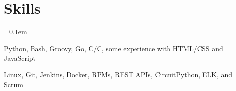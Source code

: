 \documentclass[11pt,letterpaper]{article}
\newcommand{\ResumeSection}[1]{
    \section*{ {\color{MidnightBlue}#1 \sout{\hfill} } }
}
\newcommand{\CPP}{C\nolinebreak[4]\hspace{-.05em}\raisebox{.22ex}{\footnotesize\bf ++}\xspace}
\newcommand{\hbmp}{\hspace{0.02in}}
\newcommand{\iconsize}{8px}
\newcommand{\boxwidth}{4cm}
\begin{document}


\ResumeSection{Skills}

\begin{description}[leftmargin=!, labelindent=\parindent,
                    labelwidth=\widthof{\bfseries Languages}]
    \parskip=0.1em

    \item[Languages]
        Python, Bash, Groovy, Go, C/\CPP, some experience with HTML/CSS and JavaScript

    \item[Tools]
        Linux, Git, Jenkins, Docker, RPMs, REST APIs, CircuitPython, ELK, and Scrum

\end{description}


\end{document}
